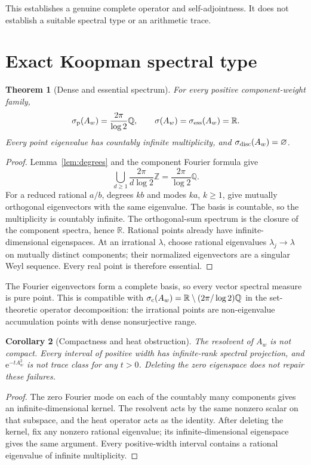 \documentclass[11pt]{article}
\newtheorem{theorem}{Theorem}
\newtheorem{corollary}[theorem]{Corollary}
\theoremstyle{remark}\newtheorem{remark}[theorem]{Remark}
\newcommand{\R}{\mathbb R}
\newcommand{\Q}{\mathbb Q}
\newcommand{\Z}{\mathbb Z}
\newcommand{\e}{\mathrm e}
\begin{document}
This establishes a genuine complete operator and self-adjointness.  It does
not establish a suitable spectral type or an arithmetic trace.

\section{Exact Koopman spectral type}

\begin{theorem}[Dense and essential spectrum]\label{thm:spectrum}
For every positive component-weight family,
\begin{equation}
 \sigma_{\rm p}(A_w)=\frac{2\pi}{\log2}\Q,
 \qquad
 \sigma(A_w)=\sigma_{\rm ess}(A_w)=\R.
 \label{eq:spectrum}
\end{equation}
Every point eigenvalue has countably infinite multiplicity, and
\(\sigma_{\rm disc}(A_w)=\varnothing\).
\end{theorem}
\begin{proof}
Lemma~\ref{lem:degrees} and the component Fourier formula give
\[
 \bigcup_{d\ge1}\frac{2\pi}{d\log2}\Z
 =\frac{2\pi}{\log2}\Q.
\]
For a reduced rational \(a/b\), degrees \(kb\) and modes \(ka\),
\(k\ge1\), give mutually orthogonal eigenvectors with the same eigenvalue.
The basis is countable, so the multiplicity is countably infinite.  The
orthogonal-sum spectrum is the closure of the component spectra, hence
\(\R\).  Rational points already have infinite-dimensional eigenspaces.  At
an irrational \(\lambda\), choose rational eigenvalues \(\lambda_j\to\lambda\)
on mutually distinct components; their normalized eigenvectors are a
singular Weyl sequence.  Every real point is therefore essential.
\end{proof}

The Fourier eigenvectors form a complete basis, so every vector spectral
measure is pure point.  This is compatible with
\(\sigma_{\rm c}(A_w)=\R\setminus(2\pi/\log2)\Q\) in the set-theoretic
operator decomposition: the irrational points are non-eigenvalue
accumulation points with dense nonsurjective range.

\begin{corollary}[Compactness and heat obstruction]\label{cor:heat}
The resolvent of \(A_w\) is not compact.  Every interval of positive width
has infinite-rank spectral projection, and \(\e^{-tA_w^2}\) is not trace
class for any \(t>0\).  Deleting the zero eigenspace does not repair these
failures.
\end{corollary}
\begin{proof}
The zero Fourier mode on each of the countably many components gives an
infinite-dimensional kernel.  The resolvent acts by the same nonzero scalar
on that subspace, and the heat operator acts as the identity.  After deleting
the kernel, fix any nonzero rational eigenvalue; its infinite-dimensional
eigenspace gives the same argument.  Every positive-width interval contains
a rational eigenvalue of infinite multiplicity.
\end{proof}
\end{document}
